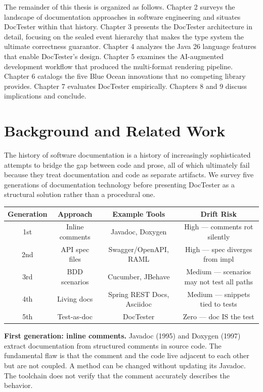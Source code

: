 \documentclass[11pt]{article}
\begin{document}
The remainder of this thesis is organized as follows. Chapter 2 surveys the landscape of documentation approaches in software engineering and situates DocTester within that history. Chapter 3 presents the DocTester architecture in detail, focusing on the sealed event hierarchy that makes the type system the ultimate correctness guarantor. Chapter 4 analyzes the Java 26 language features that enable DocTester's design. Chapter 5 examines the AI-augmented development workflow that produced the multi-format rendering pipeline. Chapter 6 catalogs the five Blue Ocean innovations that no competing library provides. Chapter 7 evaluates DocTester empirically. Chapters 8 and 9 discuss implications and conclude.

\section{Background and Related Work}

The history of software documentation is a history of increasingly sophisticated attempts to bridge the gap between code and prose, all of which ultimately fail because they treat documentation and code as separate artifacts. We survey five generations of documentation technology before presenting DocTester as a structural solution rather than a procedural one.
\cite{Fowler1999}
\cite[p. pp. 1-15]{Beck2002}

\begin{table}[h]
\centering
\begin{tabular}{|c|c|c|c|}
\hline
\textbf{Generation} & \textbf{Approach} & \textbf{Example Tools} & \textbf{Drift Risk} \\
\hline
1st & Inline comments & Javadoc, Doxygen & High — comments rot silently \\
2nd & API spec files & Swagger/OpenAPI, RAML & High — spec diverges from impl \\
3rd & BDD scenarios & Cucumber, JBehave & Medium — scenarios may not test all paths \\
4th & Living docs & Spring REST Docs, Asciidoc & Medium — snippets tied to tests \\
5th & Test-as-doc & DocTester & Zero — doc IS the test \\
\hline
\end{tabular}
\end{table}


\textbf{First generation: inline comments.} Javadoc (1995) and Doxygen (1997) extract documentation from structured comments in source code. The fundamental flaw is that the comment and the code live adjacent to each other but are not coupled. A method can be changed without updating its Javadoc. The toolchain does not verify that the comment accurately describes the behavior.
\cite{North2006}
\end{document}
